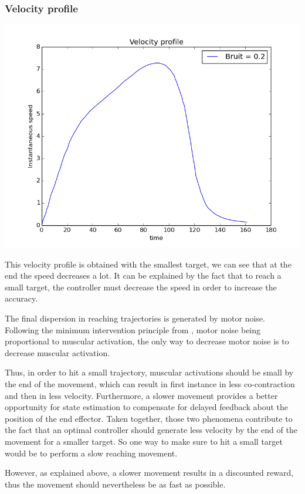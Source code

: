 \documentclass[pdftex,a4paper,11pt]{report}
\begin{document}
\subsubsection{Velocity profile}
\begin{center}
\includegraphics[scale=0.5]{figures/velocityProfileTreachSize0p02.png}
\end{center}
This velocity profile is obtained with the smallest target, we can see that at the end the speed decreases a lot. It can be explained by the fact that to reach a small target, the controller must decrease the speed in order to increase the accuracy.

The final dispersion in reaching trajectories is generated by motor noise.
Following the minimum intervention principle from \cite{todorov02_NN}, motor noise being proportional to muscular activation, the only way to decrease motor noise is to decrease muscular activation.

Thus, in order to hit a small trajectory, muscular activations should be small
by the end of the movement, which can result in first instance in less co-contraction and then in less velocity. Furthermore, a slower movement provides a better opportunity for state estimation to compensate for delayed feedback about the position of the end effector. Taken together, those two phenomena contribute to the fact that an optimal controller should generate less velocity by the end of the movement for a smaller target.
So one way to make sure to hit a small target would be to perform a slow reaching movement.

However, as explained above, a slower movement results in a discounted reward,
thus the movement should nevertheless be as fast as possible.
\end{document}

